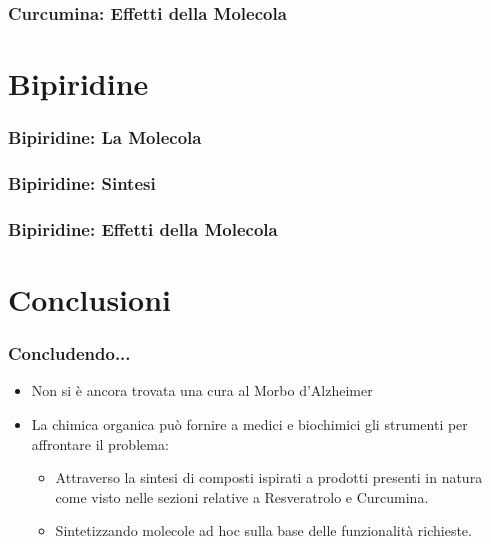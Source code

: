 \documentclass[9pt]{beamer}
\begin{document}
\begin{frame}
	\frametitle{Curcumina: Effetti della Molecola}
	
\end{frame}

\section{Bipiridine}

\begin{frame}
	\frametitle{Bipiridine: La Molecola}
\end{frame}

\begin{frame}
	\frametitle{Bipiridine: Sintesi}
\end{frame}

\begin{frame}
	\frametitle{Bipiridine: Effetti della Molecola}
\end{frame}

\section{Conclusioni}

\begin{frame}
	\frametitle{Concludendo...}
	\begin{itemize}
		\item Non si è ancora trovata una cura al Morbo d'Alzheimer
		\item La chimica organica può fornire a medici e biochimici gli strumenti per affrontare il problema: \begin{itemize}
			      \item Attraverso la sintesi di composti ispirati a prodotti 	presenti in natura come visto nelle sezioni relative a Resveratrolo e Curcumina.
			      \item Sintetizzando molecole ad hoc sulla base delle funzionalità richieste.
		      \end{itemize}
	\end{itemize}
\end{frame}


\begin{frame}
\end{frame}
\end{document}
